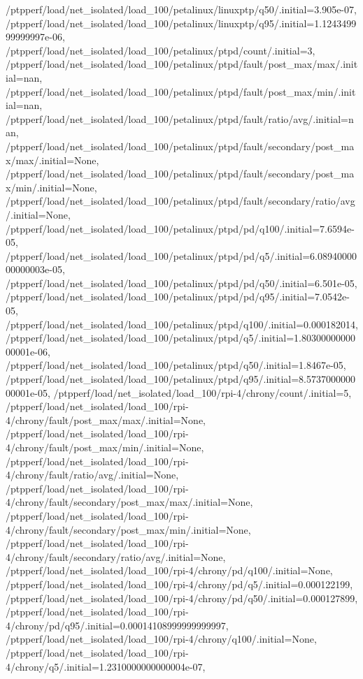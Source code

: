 {    /ptpperf/load/net_isolated/load_100/petalinux/linuxptp/q50/.initial=3.905e-07,
    /ptpperf/load/net_isolated/load_100/petalinux/linuxptp/q95/.initial=1.124349999999997e-06,
    /ptpperf/load/net_isolated/load_100/petalinux/ptpd/count/.initial=3,
    /ptpperf/load/net_isolated/load_100/petalinux/ptpd/fault/post_max/max/.initial=nan,
    /ptpperf/load/net_isolated/load_100/petalinux/ptpd/fault/post_max/min/.initial=nan,
    /ptpperf/load/net_isolated/load_100/petalinux/ptpd/fault/ratio/avg/.initial=nan,
    /ptpperf/load/net_isolated/load_100/petalinux/ptpd/fault/secondary/post_max/max/.initial=None,
    /ptpperf/load/net_isolated/load_100/petalinux/ptpd/fault/secondary/post_max/min/.initial=None,
    /ptpperf/load/net_isolated/load_100/petalinux/ptpd/fault/secondary/ratio/avg/.initial=None,
    /ptpperf/load/net_isolated/load_100/petalinux/ptpd/pd/q100/.initial=7.6594e-05,
    /ptpperf/load/net_isolated/load_100/petalinux/ptpd/pd/q5/.initial=6.0894000000000003e-05,
    /ptpperf/load/net_isolated/load_100/petalinux/ptpd/pd/q50/.initial=6.501e-05,
    /ptpperf/load/net_isolated/load_100/petalinux/ptpd/pd/q95/.initial=7.0542e-05,
    /ptpperf/load/net_isolated/load_100/petalinux/ptpd/q100/.initial=0.000182014,
    /ptpperf/load/net_isolated/load_100/petalinux/ptpd/q5/.initial=1.8030000000000001e-06,
    /ptpperf/load/net_isolated/load_100/petalinux/ptpd/q50/.initial=1.8467e-05,
    /ptpperf/load/net_isolated/load_100/petalinux/ptpd/q95/.initial=8.573700000000001e-05,
    /ptpperf/load/net_isolated/load_100/rpi-4/chrony/count/.initial=5,
    /ptpperf/load/net_isolated/load_100/rpi-4/chrony/fault/post_max/max/.initial=None,
    /ptpperf/load/net_isolated/load_100/rpi-4/chrony/fault/post_max/min/.initial=None,
    /ptpperf/load/net_isolated/load_100/rpi-4/chrony/fault/ratio/avg/.initial=None,
    /ptpperf/load/net_isolated/load_100/rpi-4/chrony/fault/secondary/post_max/max/.initial=None,
    /ptpperf/load/net_isolated/load_100/rpi-4/chrony/fault/secondary/post_max/min/.initial=None,
    /ptpperf/load/net_isolated/load_100/rpi-4/chrony/fault/secondary/ratio/avg/.initial=None,
    /ptpperf/load/net_isolated/load_100/rpi-4/chrony/pd/q100/.initial=None,
    /ptpperf/load/net_isolated/load_100/rpi-4/chrony/pd/q5/.initial=0.000122199,
    /ptpperf/load/net_isolated/load_100/rpi-4/chrony/pd/q50/.initial=0.000127899,
    /ptpperf/load/net_isolated/load_100/rpi-4/chrony/pd/q95/.initial=0.00014108999999999997,
    /ptpperf/load/net_isolated/load_100/rpi-4/chrony/q100/.initial=None,
    /ptpperf/load/net_isolated/load_100/rpi-4/chrony/q5/.initial=1.2310000000000004e-07,
}
